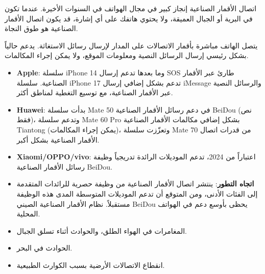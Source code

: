 


اتصال الأقمار الصناعية إنجاز كبير في مجال الهواتف في السنوات الأخيرة. عندما تكون في البرية أو الجبال العميقة، ولا يحتوي هاتفك على أي إشارة، قد يكون اتصال الأقمار الصناعية هو طوق النجاة.


يتصل الهاتف مباشرة بأقمار الاتصالات على المدار لإرسال رسائل الاستغاثة. يدعم حالياً بشكل رئيسي إرسال الرسائل النصية ومعلومات الموقع، ولا يمكن إجراء المكالمات.


\begin{itemize}
  \item \textbf{Apple}: سلسلة iPhone 14 وما بعدها تدعم إرسال SOS طارئ عبر الأقمار الصناعية. سلسلة iPhone 17 تدعم بشكل إضافي إرسال iMessage والرسائل النصية عبر الأقمار الصناعية، مع توسيع التغطية لمناطق أكثر.
  \item \textbf{Huawei}: بدأت سلسلة Mate 50 في دعم رسائل الأقمار الصناعية BeiDou (نص فقط)، وتدعم سلسلة Mate 60 Pro بشكل إضافي مكالمات الأقمار الصناعية Tiantong (يمكن إجراء المكالمات)، وتعزّزت سلسلة Mate 70 من قدرات اتصال الأقمار الصناعية بشكل أكبر.
  \item \textbf{Xiaomi/OPPO/vivo}: اعتباراً من 2024، تدعم الموديلات الرائدة تدريجياً وظيفة رسائل الأقمار الصناعية BeiDou.
  \item \textbf{اتجاه التطور}: ينتشر اتصال الأقمار الصناعية من وظيفة حصرية للرائدات المتقدمة إلى الفئات الأدنى، ومن المتوقع أن تدعم الموديلات المتوسطة المدى هذه الوظيفة مستقبلاً. نظام الأقمار الصناعية الصيني BeiDou يحظى بأوسع دعم في الهواتف المحلية.
\end{itemize}


\begin{itemize}
  \item المغامرات في الهواء الطلق، والحوادث أثناء تسلق الجبال.
  \item الحوادث في البحر.
  \item انقطاع الاتصالات الأرضية بسبب الكوارث الطبيعية.
\end{itemize}

